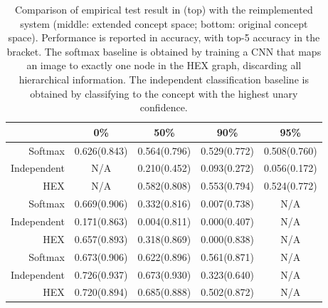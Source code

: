 \documentclass[11pt,a4paper]{book}
\begin{document}
\begin{table}[htbp]
\centering
\begin{tabular}{r|c|c|c|c}
 & 0\% & 50\% & 90\% & 95\%\\
\hline
Softmax     & 0.626(0.843) & 0.564(0.796) & 0.529(0.772) & 0.508(0.760)\\
Independent & N/A          & 0.210(0.452) & 0.093(0.272) & 0.056(0.172)\\
HEX         & N/A          & 0.582(0.808) & 0.553(0.794) & 0.524(0.772)\\
\hline
Softmax     & 0.669(0.906) & 0.332(0.816) & 0.007(0.738) & N/A\\
Independent & 0.171(0.863) & 0.004(0.811) & 0.000(0.407) & N/A\\
HEX         & 0.657(0.893) & 0.318(0.869) & 0.000(0.838) & N/A\\
\hline
Softmax     & 0.673(0.906) & 0.622(0.896) & 0.561(0.871) & N/A\\
Independent & 0.726(0.937) & 0.673(0.930) & 0.323(0.640) & N/A\\
HEX         & 0.720(0.894) & 0.685(0.888) & 0.502(0.872) & N/A
\end{tabular}
\caption{Comparison of empirical test result in \cite{deng2014large} (top) with the reimplemented system (middle: extended concept space; bottom: original concept space). Performance is reported in accuracy, with top-5 accuracy in the bracket. The softmax baseline is obtained by training a CNN that maps an image to exactly one node in the HEX graph, discarding all hierarchical information. The independent classification baseline is obtained by classifying to the concept with the highest unary confidence.}
\label{tab:original}
\end{table}
\end{document}
